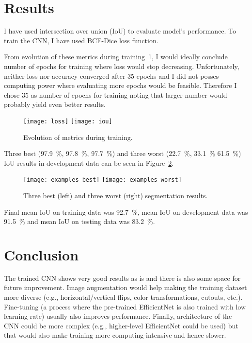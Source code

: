 \documentclass[9pt]{IEEEtran}
\begin{document}
\section{Results}
I have used intersection over union (IoU) to evaluate model's performance.
To train the CNN, I have used BCE-Dice loss function.

From evolution of these metrics during training~\ref{fig:evo}, I would ideally conclude number of epochs for training where loss would stop decreasing.
Unfortunately, neither loss nor accuracy converged after 35 epochs and I did not posses computing power where evaluating more epochs would be feasible.
Therefore I chose 35 as number of epochs for training noting that larger number would probably yield even better results.

\begin{figure}[h]
    \centering
    \texttt{[image: loss]}
    \texttt{[image: iou]}
    \caption{Evolution of metrics during training.}
    \label{fig:evo}
\end{figure}

Three best (97.9~\%, 97.8~\%, 97.7~\%) and three worst (22.7~\%, 33.1~\% 61.5~\%) IoU results in development data can be seen in Figure~\ref{fig:examples}.

\begin{figure}[h]
    \centering
    \texttt{[image: examples-best]}
    \texttt{[image: examples-worst]}
    \caption{Three best (left) and three worst (right) segmentation results.}
    \label{fig:examples}
\end{figure}

Final mean IoU on training data was 92.7~\%, mean IoU on development data was 91.5~\% and mean IoU on testing data was 83.2~\%.

\section{Conclusion}
The trained CNN shows very good results as is and there is also some space for future improvement.
Image augmentation would help making the training dataset more diverse (e.g., horizontal/vertical flips, color transformations, cutouts, etc.).
Fine-tuning (a process where the pre-trained EfficientNet is also trained with low learning rate) usually also improves performance.
Finally, architecture of the CNN could be more complex (e.g., higher-level EfficientNet could be used) but that would also make training more computing-intensive and hence slower.



\end{document}
